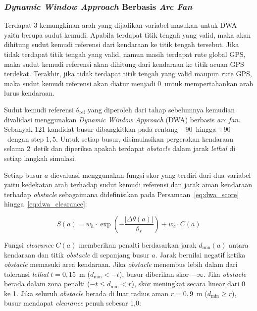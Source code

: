 \subsubsection{\emph{Dynamic Window Approach} Berbasis \emph{Arc Fan}}

Terdapat 3 kemungkinan arah yang dijadikan variabel masukan untuk DWA yaitu berupa sudut kemudi.
Apabila terdapat titik tengah yang valid, maka akan dihitung sudut kemudi referensi dari kendaraan ke titik tengah tersebut.
Jika tidak terdapat titik tengah yang valid, namun masih terdapat rute global GPS, maka sudut kemudi referensi akan dihitung dari kendaraan ke titik acuan GPS terdekat.
Terakhir, jika tidak terdapat titik tengah yang valid maupun rute GPS, maka sudut kemudi referensi akan diatur menjadi 0\textdegree\ untuk mempertahankan arah lurus kendaraan.

Sudut kemudi referensi $\theta_{\text{ref}}$ yang diperoleh dari tahap sebelumnya kemudian divalidasi menggunakan \emph{Dynamic Window Approach} (DWA) berbasis \emph{arc fan}.
Sebanyak 121 kandidat busur dibangkitkan pada rentang $-90$\textdegree\ hingga $+90$\textdegree\ dengan step $1{,}5$\textdegree.
Untuk setiap busur, disimulasikan pergerakan kendaraan selama 2~detik dan diperiksa apakah terdapat \emph{obstacle} dalam jarak \emph{lethal} di setiap langkah simulasi.

Setiap busur $a$ dievaluasi menggunakan fungsi skor yang terdiri dari dua variabel yaitu kedekatan arah terhadap sudut kemudi referensi dan jarak aman kendaraan terhadap \emph{obstacle} sebagaimana didefinisikan pada Persamaan~\eqref{eq:dwa_score} hingga~\eqref{eq:dwa_clearance}:

\begin{equation}
S(a) = w_h \cdot \exp\!\left(-\frac{|\Delta\theta(a)|}{\theta_s}\right) + w_c \cdot C(a)
\label{eq:dwa_score}
\end{equation}

Fungsi \emph{clearance} $C(a)$ memberikan penalti berdasarkan jarak $d_{\min}(a)$ antara kendaraan dan titik \emph{obstacle} di sepanjang busur $a$.
Jarak bernilai negatif ketika \emph{obstacle} memasuki area kendaraan.
Jika \emph{obstacle} menembus lebih dalam dari toleransi \emph{lethal} $t = 0{,}15$~m ($d_{\min} < -t$), busur diberikan skor $-\infty$.
Jika \emph{obstacle} berada dalam zona penalti ($-t \leq d_{\min} < r$), skor meningkat secara linear dari 0 ke 1.
Jika seluruh \emph{obstacle} berada di luar radius aman $r = 0{,}9$~m ($d_{\min} \geq r$), busur mendapat \emph{clearance} penuh sebesar 1,0:

